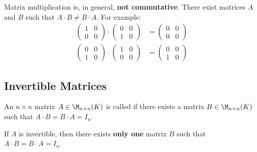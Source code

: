 \begin{importantremark}
Matrix multiplication is, in general, \textbf{not commutative}. There exist matrices $A$ and $B$ such that $A \cdot B \neq B \cdot A$. For example:
\begin{align*}
    \begin{pmatrix} 1 & 0 \\ 0 & 0 \end{pmatrix} \cdot \begin{pmatrix} 0 & 0 \\ 1 & 0 \end{pmatrix} &= \begin{pmatrix} 0 & 0 \\ 0 & 0 \end{pmatrix} \\
    \begin{pmatrix} 0 & 0 \\ 1 & 0 \end{pmatrix} \cdot \begin{pmatrix} 1 & 0 \\ 0 & 0 \end{pmatrix} &= \begin{pmatrix} 0 & 0 \\ 1 & 0 \end{pmatrix}
\end{align*}
\end{importantremark}

\subsection{Invertible Matrices}

\begin{definition}[Invertibility]
\label{def:invertible_matrix}
An $n \times n$ matrix $A \in \M_{n \times n}(K)$ is called  if there exists a matrix $B \in \M_{n \times n}(K)$ such that $A \cdot B = B \cdot A = I_n$.
\end{definition}

\begin{proposition*}
\label{prop:uniqueness_of_inverse_matrix}
If $A$ is invertible, then there exists \textbf{only one} matrix $B$ such that $A \cdot B = B \cdot A = I_n$.
\end{proposition*}

